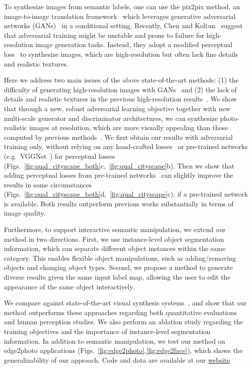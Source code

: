 \documentclass[10pt,twocolumn,letterpaper]{article}
\newcommand{\ck}{Chen and Koltun~\cite{chen2017photographic}\xspace}
\newcommand{\pp}{pix2pix\xspace}
\begin{document}
To synthesize images from semantic labels, one can use the \pp method, an image-to-image translation framework~\cite{isola2016image} which leverages generative adversarial networks (GANs)~\cite{goodfellow2014generative} in a conditional setting. Recently, \ck suggest that adversarial training might be unstable and prone to failure for high-resolution image generation tasks. Instead, they adopt a modified perceptual loss~\cite{gatys2016image,dosovitskiy2016generating,johnson2016perceptual} to synthesize images, which are high-resolution but often lack fine details and realistic textures.

Here we address two main issues of the above state-of-the-art methods: (1) the difficulty of generating high-resolution images with GANs~\cite{isola2016image} and (2) the lack of details and realistic textures in the previous high-resolution results~\cite{chen2017photographic}. We show that through a new, robust adversarial learning objective together with new multi-scale generator and discriminator architectures, we can synthesize photo-realistic images at  resolution, which are more visually appealing than those computed by previous methods~\cite{isola2016image,chen2017photographic}. 
We first obtain our results with adversarial training only, without relying on any hand-crafted losses~\cite{rudin1992nonlinear} or pre-trained networks (e.g.\ VGGNet~\cite{simonyan2014very}) for perceptual losses~\cite{dosovitskiy2016generating,johnson2016perceptual} (Figs.~\ref{fig:qual_cityscape_both}c,~\ref{fig:qual_cityscape}b). Then we show that adding perceptual losses from pre-trained networks~\cite{simonyan2014very} can slightly improve the results in some circumstances (Figs.~\ref{fig:qual_cityscape_both}d,~\ref{fig:qual_cityscape}c), if a pre-trained network is available. Both results outperform previous works substantially in terms of image quality.

Furthermore, to support interactive semantic manipulation, we extend our method in two directions. First, we use instance-level object segmentation information, which can separate different object instances within the same category.
This enables flexible object manipulations, such as adding/removing objects and changing object types. Second, we propose a method to generate diverse results given the same input label map, allowing the user to edit the appearance of the same object interactively.

We compare against state-of-the-art visual synthesis systems~\cite{chen2017photographic,isola2016image}, and show that our method outperforms these approaches regarding both quantitative evaluations and human perception studies. We also perform an ablation study regarding the training objectives and the importance of instance-level segmentation information. 
In addition to semantic manipulation, we test our method on edge2photo applications (Figs.~\ref{fig:edge2photo},\ref{fig:edge2face}), which shows the generalizability of our approach.
Code and data are available at our \href{https://tcwang0509.github.io/pix2pixHD/}{website}
\end{document}
